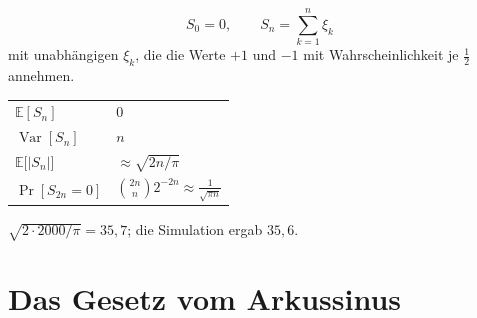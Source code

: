 \begin{definition}
\[ S_0 = 0, \qquad S_n = \sum_{k=1}^{n} \xi_k \]
mit unabhängigen $\xi_k$, die die Werte $+1$ und $-1$ mit Wahrscheinlichkeit je $\tfrac12$ annehmen.
\end{definition}

\begin{merksatz}
\begin{center}
{\small
\renewcommand{\arraystretch}{1.5}
\begin{tabular}{@{}P{3.0cm}P{3.0cm}@{}}
\toprule
$\mathbb{E}[S_n]$ & $0$\\
$\operatorname{Var}[S_n]$ & $n$\\
$\mathbb{E}\bigl[|S_n|\bigr]$ & $\approx \sqrt{2n/\pi}$\\
$\Pr[S_{2n} = 0]$ & $\binom{2n}{n}2^{-2n} \approx \frac{1}{\sqrt{\pi n}}$\\
\bottomrule
\end{tabular}}
\end{center}

 $\sqrt{2\cdot2000/\pi} = 35{,}7$; die Simulation ergab $35{,}6$.

\begin{center}
\begin{minipage}{0.88\textwidth}
\end{minipage}
\end{center}
\end{merksatz}

\section{Das Gesetz vom Arkussinus}

